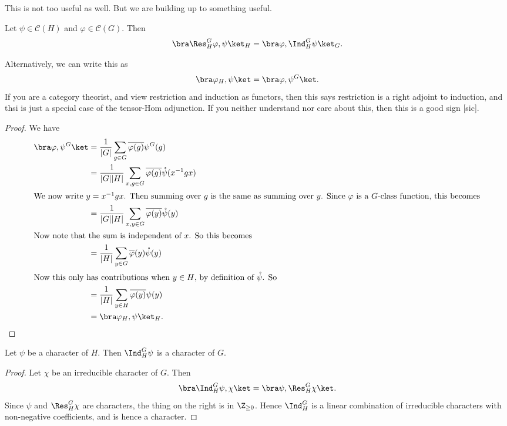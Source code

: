 \documentclass[a4paper]{article}
\begin{document}
This is not too useful as well. But we are building up to something useful.

\begin{thm}
  Let $\psi \in \mathcal{C}(H)$ and $\varphi \in \mathcal{C}(G)$. Then
  \[
    \bra \Res_H^G \varphi, \psi\ket_H = \bra \varphi, \Ind_H^G \psi\ket_G.
  \]
\end{thm}
Alternatively, we can write this as
\[
  \bra \varphi_H, \psi\ket = \bra \varphi, \psi^G\ket.
\]
If you are a category theorist, and view restriction and induction as functors, then this says restriction is a right adjoint to induction, and thsi is just a special case of the tensor-Hom adjunction. If you neither understand nor care about this, then this is a good sign [sic].

\begin{proof}
  We have
  \begin{align*}
    \bra \varphi, \psi^G\ket &= \frac{1}{|G|} \sum_{g \in G} \overline{\varphi(g)}\psi^G(g) \\
    &= \frac{1}{|G||H|} \sum_{x, g \in G} \overline{\varphi(g)} \mathring{\psi}(x^{-1}gx)\\
    \intertext{We now write $y = x^{-1} gx$. Then summing over $g$ is the same as summing over $y$. Since $\varphi$ is a $G$-class function, this becomes}
    &= \frac{1}{|G||H|} \sum_{x, y \in G} \overline{\varphi(y)} \mathring{\psi}(y)\\
    \intertext{Now note that the sum is independent of $x$. So this becomes}
    &=\frac{1}{|H|} \sum_{y \in G} \overline{\varphi}(y) \mathring{\psi}(y)\\
    \intertext{Now this only has contributions when $y \in H$, by definition of $\mathring{\psi}$. So}
    &= \frac{1}{|H|} \sum_{y \in H} \overline{\varphi(y)}\psi(y)\\
    &= \bra \varphi_H, \psi\ket_H.
  \end{align*}
\end{proof}

\begin{cor}
  Let $\psi$ be a character of $H$. Then $\Ind_H^G \psi$ is a character of $G$.
\end{cor}

\begin{proof}
  Let $\chi$ be an irreducible character of $G$. Then
  \[
    \bra \Ind_H^G \psi, \chi\ket = \bra \psi, \Res_H^G \chi\ket.
  \]
  Since $\psi$ and $\Res_H^G \chi$ are characters, the thing on the right is in $\Z_{\geq 0}$. Hence $\Ind_H^G$ is a linear combination of irreducible characters with non-negative coefficients, and is hence a character.
\end{proof}
\end{document}
